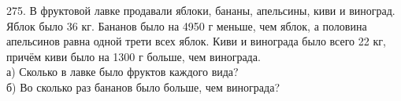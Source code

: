 275. В фруктовой лавке продавали яблоки, бананы, апельсины, киви и виноград. Яблок было 36 кг. Бананов было на 4950 г меньше, чем яблок, а половина апельсинов равна одной трети всех яблок. Киви и винограда было всего 22 кг, причём киви было на 1300 г больше, чем винограда.\\
а) Сколько в лавке было фруктов каждого вида?\\
б) Во сколько раз бананов было больше, чем винограда?\\
